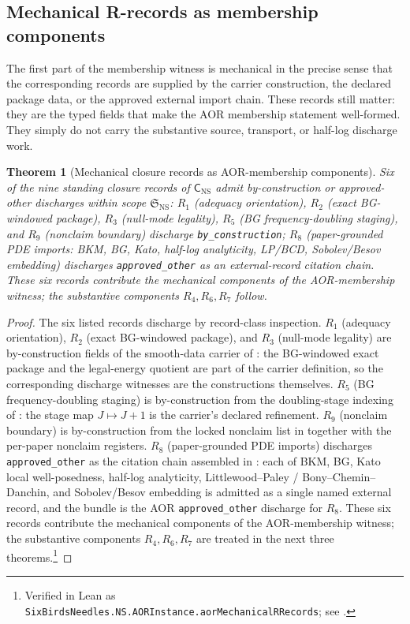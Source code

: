\documentclass[11pt]{article}
\newtheorem{theorem}{Theorem}[section]
\theoremstyle{definition}
\begin{document}
\subsection{Mechanical R-records as membership components}

The first part of the membership witness is mechanical in the precise
sense that the corresponding records are supplied by the carrier
construction, the declared package data, or the approved external
import chain.  These records still matter: they are the typed fields
that make the AOR membership statement well-formed.  They simply do not
carry the substantive source, transport, or half-log discharge work.

\begin{theorem}[Mechanical closure records as AOR-membership components]\label{thm:ns:aor-mechanical-r-records}
Six of the nine standing closure records of $\mathsf C_{\mathrm{NS}}$ admit by-construction or approved-other discharges within scope $\mathfrak S_{\mathrm{NS}}$: $R_1$ (adequacy orientation), $R_2$ (exact BG-windowed package), $R_3$ (null-mode legality), $R_5$ (BG frequency-doubling staging), and $R_9$ (nonclaim boundary) discharge \texttt{by\_construction}; $R_8$ (paper-grounded PDE imports: BKM, BG, Kato, half-log analyticity, LP/BCD, Sobolev/Besov embedding) discharges \texttt{approved\_other} as an external-record citation chain.  These six records contribute the mechanical components of the AOR-membership witness; the substantive components $R_4,R_6,R_7$ follow.
\end{theorem}

\begin{proof}
The six listed records discharge by record-class inspection.
\(R_1\) (adequacy orientation), \(R_2\) (exact BG-windowed
package), and \(R_3\) (null-mode legality) are by-construction
fields of the smooth-data carrier of :
the BG-windowed exact package and the legal-energy quotient
are part of the carrier definition, so the corresponding
discharge witnesses are the constructions themselves.  \(R_5\)
(BG frequency-doubling staging) is by-construction from the
doubling-stage indexing of : the
stage map \(J\mapsto J+1\) is the carrier's declared
refinement.  \(R_9\) (nonclaim boundary) is by-construction
from the locked nonclaim list in  together
with the per-paper nonclaim registers.  \(R_8\) (paper-grounded
PDE imports) discharges \texttt{approved\_other} as the
citation chain assembled in : each of BKM,
BG, Kato local well-posedness, half-log analyticity,
Littlewood--Paley / Bony--Chemin--Danchin, and Sobolev/Besov
embedding is admitted as a single named external record, and
the bundle is the AOR \texttt{approved\_other} discharge for
\(R_8\).  These six records contribute the mechanical
components of the AOR-membership witness; the substantive
components \(R_4,R_6,R_7\) are treated in the next three
theorems.\footnote{Verified in Lean as \texttt{SixBirdsNeedles.NS.AORInstance.aorMechanicalRRecords}; see .}
\end{proof}
\end{document}
